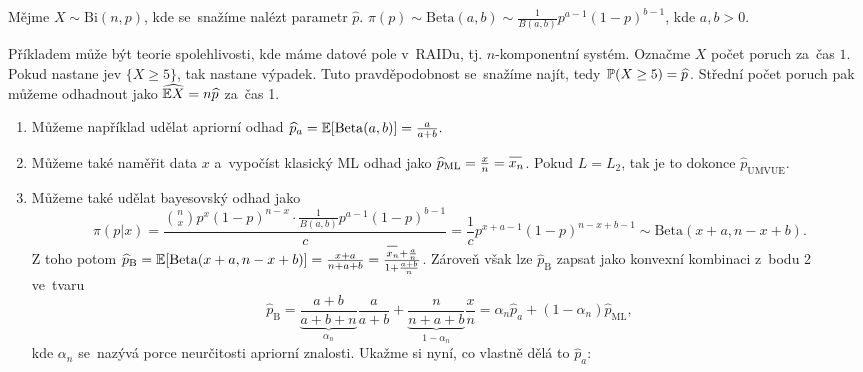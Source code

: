 \begin{example}
	Mějme $X\sim \mathrm{Bi}(n,p)$, kde se~snažíme nalézt parametr $\widehat{p}$. $\pi(p)\sim\mathrm{Beta}(a,b)\sim\frac{1}{B(a,b)}p^{a-1}(1-p)^{b-1}$, kde $a,b>0$. 
	
	Příkladem může být teorie spolehlivosti, kde máme datové pole v~RAIDu, tj. $n$-komponentní systém. Označme $X$ počet poruch za~čas $1$. Pokud nastane jev $\{X\geq5\}$, tak nastane výpadek. Tuto pravděpodobnost se~snažíme najít, tedy $\mathbb{P}(X\geq5)=\widehat{p}$. Střední počet poruch pak můžeme odhadnout jako $\widehat{\mathbb{E} X}=n\widehat{p}$ za~čas 1.
	
	\begin{enumerate}[1)]
		\item Můžeme například udělat apriorní odhad $\widehat{p}_a=\mathbb{E}[\mathrm{Beta}(a,b)]=\frac{a}{a+b}.$
		\item Můžeme také naměřit data $x$ a~vypočíst klasický ML odhad jako $\widehat{p}_\mathrm{ML}=\frac{x}{n}=\oxnn$. Pokud $L=L_2$, tak je to dokonce $\widehat{p}_\mathrm{UMVUE}$.
		\item Můžeme také udělat bayesovský odhad jako $$\pi(p|x)=\frac{\binom{n}{x}p^x(1-p)^{n-x}\cdot\frac{1}{B(a,b)}p^{a-1}(1-p)^{b-1}}{c}=\frac{1}{c}p^{x+a-1}(1-p)^{n-x+b-1}\sim\mathrm{Beta}(x+a,n-x+b).$$
		Z toho potom $\widehat{p}_\mathrm{B}=\E [\mathrm{Beta}(x+a,n-x+b)]=\frac{x+a}{n+a+b}=\frac{\oxnn+\frac{a}{n}}{1+\frac{a+b}{n}}$. Zároveň však lze $\widehat{p}_\mathrm{B}$ zapsat jako konvexní kombinaci z~bodu 2 ve~tvaru
		$$ \widehat{p}_\mathrm{B}=\underbrace{\frac{a+b}{a+b+n}}_{\alpha_n}\frac{a}{a+b}+\underbrace{\frac{n}{n+a+b}}_{1-\alpha_n}\frac{x}{n}=\alpha_n\widehat{p}_a+(1-\alpha_n)\widehat{p}_\mathrm{ML},$$ kde $\alpha_n$ se~nazývá porce neurčitosti apriorní znalosti. Ukažme si nyní, co vlastně dělá to $\widehat{p}_a$:
		\begin{figure}[h]
			\centering
\end{figure}
\end{enumerate}
\end{example}

